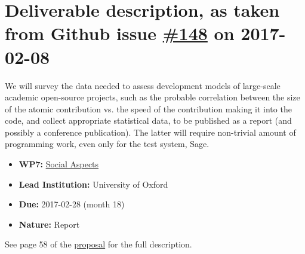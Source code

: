 \section*{\texorpdfstring{Deliverable description, as taken from Github
issue
\href{https://github.com/OpenDreamKit/OpenDreamKit/issues/148}{\#148} on
2017-02-08}{Deliverable description, as taken from Github issue \#148 on 2017-02-08}}\label{deliverable-description-as-taken-from-github-issue-148-on-2017-02-08}
We will survey the data needed to assess development models of large-scale
academic open-source projects, such as the probable correlation between the
size of the atomic contribution vs. the speed of the contribution making it
into the code, and collect appropriate statistical data, to be published as a
report (and possibly a conference publication). The latter will require
non-trivial amount of programming work, even only for the test system, Sage.

\begin{itemize}
\tightlist
\item
  \textbf{WP7:}
  \href{https://github.com/OpenDreamKit/OpenDreamKit/tree/master/WP7}{Social
  Aspects}
\item
  \textbf{Lead Institution:} University of Oxford
\item
  \textbf{Due:} 2017-02-28 (month 18)
\item
  \textbf{Nature:} Report
\end{itemize}

See page 58 of the
\href{https://github.com/OpenDreamKit/OpenDreamKit/raw/master/Proposal/proposal-www.pdf}{proposal}
for the full description.
